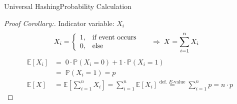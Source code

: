 \begin{frame}{Universal Hashing}{Probability Calculation}
  \begin{proof}[Proof Corollary:]
    Indicator variable: $X_i$\\
    \vspace*{-1.5em}
    \begin{align*}
      X_i &=
        \left\lbrace
        \begin{array}{ll}
        1, & \text{if event occurs}\\
        0, & \text{else}
        \end{array}
        \right. \hspace{1.5em}
        \Rightarrow \; X = \sum_{i=1}^{n} X_i
    \end{align*}
    \vspace*{-1.0em}
    \begin{align*}
      \mathbb{E}[X_i]
        &= \; 0 \cdot \mathbb{P}(X_i = 0) + 1 \cdot \mathbb{P}(X_i = 1)\\
      {} &= \; \mathbb{P}(X_i = 1) = p\\[0.5em]
      \mathbb{E}[X] &= \mathbb{E}\left[\sum_{i=1}^{n} X_i\right]
      = \sum_{i=1}^{n} \mathbb{E}[X_i]
      \stackrel{\text{def. $E$-value}}{=}
      \sum_{i=1}^{n} p = n \cdot p
    \end{align*}
    \qedhere
  \end{proof}
\end{frame}